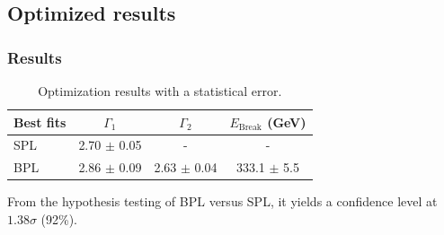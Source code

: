 \documentclass{beamer}
\begin{document}
\subsection{Optimized results}
\begin{frame}
\frametitle{Results}
\begin{table}
\begin{tabular}{l | c | c | c}
  Best fits & $\Gamma_1$ & $\Gamma_2$ & $E_{\text{Break}}$ (GeV) \\
  \hline \hline
  SPL & 2.70 $\pm$ 0.05 & - & -  \\
  BPL & 2.86 $\pm$ 0.09 & 2.63 $\pm$ 0.04 & 333.1 $\pm$ 5.5
\end{tabular}
\caption{Optimization results with a statistical error.}
\end{table}

From the hypothesis testing of BPL versus SPL, it yields
a confidence level at $1.38\sigma$ (92\%).

\end{frame}
\end{document}
